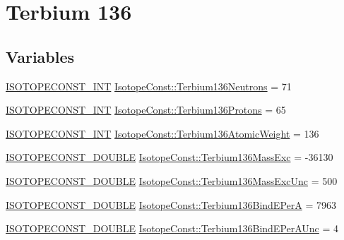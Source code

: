 \hypertarget{group___isotope_const-_terbium-_tb136}{}\section{Terbium 136}
\label{group___isotope_const-_terbium-_tb136}
\subsection*{Variables}
\begin{DoxyCompactItemize}
\item 
\mbox{\hyperlink{group___isotope_const-_macros_ga5f18360b3e99483a35c32d789e62621c}{I\+S\+O\+T\+O\+P\+E\+C\+O\+N\+S\+T\+\_\+\+I\+NT}} \mbox{\hyperlink{group___isotope_const-_terbium-_tb136_ga60faa34b6cef6df7ca20802eae3c1313}{Isotope\+Const\+::\+Terbium136\+Neutrons}} = 71
\item 
\mbox{\hyperlink{group___isotope_const-_macros_ga5f18360b3e99483a35c32d789e62621c}{I\+S\+O\+T\+O\+P\+E\+C\+O\+N\+S\+T\+\_\+\+I\+NT}} \mbox{\hyperlink{group___isotope_const-_terbium-_tb136_ga49fa31239de2c31b309eb405c59826f4}{Isotope\+Const\+::\+Terbium136\+Protons}} = 65
\item 
\mbox{\hyperlink{group___isotope_const-_macros_ga5f18360b3e99483a35c32d789e62621c}{I\+S\+O\+T\+O\+P\+E\+C\+O\+N\+S\+T\+\_\+\+I\+NT}} \mbox{\hyperlink{group___isotope_const-_terbium-_tb136_ga97a69daf179ce38ecb408b6d50072371}{Isotope\+Const\+::\+Terbium136\+Atomic\+Weight}} = 136
\item 
\mbox{\hyperlink{group___isotope_const-_macros_ga8f45a7272ce02c0b4c65c44636ed719a}{I\+S\+O\+T\+O\+P\+E\+C\+O\+N\+S\+T\+\_\+\+D\+O\+U\+B\+LE}} \mbox{\hyperlink{group___isotope_const-_terbium-_tb136_gacb1b4a5978413613c4a887ca8cf74f36}{Isotope\+Const\+::\+Terbium136\+Mass\+Exc}} = -\/36130
\item 
\mbox{\hyperlink{group___isotope_const-_macros_ga8f45a7272ce02c0b4c65c44636ed719a}{I\+S\+O\+T\+O\+P\+E\+C\+O\+N\+S\+T\+\_\+\+D\+O\+U\+B\+LE}} \mbox{\hyperlink{group___isotope_const-_terbium-_tb136_ga017260d23dac51b0db0fa5f9b3978f1d}{Isotope\+Const\+::\+Terbium136\+Mass\+Exc\+Unc}} = 500
\item 
\mbox{\hyperlink{group___isotope_const-_macros_ga8f45a7272ce02c0b4c65c44636ed719a}{I\+S\+O\+T\+O\+P\+E\+C\+O\+N\+S\+T\+\_\+\+D\+O\+U\+B\+LE}} \mbox{\hyperlink{group___isotope_const-_terbium-_tb136_ga14a52ea194ce8ef816fe8571c5c51a7c}{Isotope\+Const\+::\+Terbium136\+Bind\+E\+PerA}} = 7963
\item 
\mbox{\hyperlink{group___isotope_const-_macros_ga8f45a7272ce02c0b4c65c44636ed719a}{I\+S\+O\+T\+O\+P\+E\+C\+O\+N\+S\+T\+\_\+\+D\+O\+U\+B\+LE}} \mbox{\hyperlink{group___isotope_const-_terbium-_tb136_ga4b123bd5360aebd689a9f18f254ca5ec}{Isotope\+Const\+::\+Terbium136\+Bind\+E\+Per\+A\+Unc}} = 4

\end{DoxyCompactItemize}
